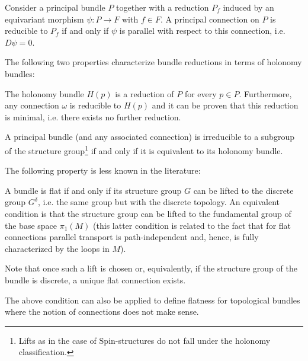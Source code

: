     \begin{property}\label{bundle:connection_reducibility}
        Consider a principal bundle $P$ together with a reduction $P_f$ induced by an equivariant morphism $\psi:P\rightarrow F$ with $f\in F$. A principal connection on $P$ is reducible to $P_f$ if and only if $\psi$ is parallel with respect to this connection, i.e. $D\psi = 0$.
    \end{property}

    The following two properties characterize bundle reductions in terms of holonomy bundles:
    \begin{property}
        The holonomy bundle $H(p)$ is a reduction of $P$ for every $p\in P$. Furthermore, any connection $\omega$ is reducible to $H(p)$ and it can be proven that this reduction is minimal, i.e. there exists no further reduction.
    \end{property}
    \begin{result}\label{bundle:reducible_holonomy}
        A principal bundle (and any associated connection) is irreducible to a subgroup of the structure group\footnote{Lifts as in the case of $\mathrm{Spin}$-structures do not fall under the holonomy classification.} if and only if it is equivalent to its holonomy bundle.
    \end{result}

    The following property is less known in the literature:
    \begin{property}\label{bundle:flat_connection_cohomology}
        A bundle is flat if and only if its structure group $G$ can be lifted to the discrete group $G^\delta$, i.e. the same group but with the discrete topology. An equivalent condition is that the structure group can be lifted to the fundamental group of the base space $\pi_1(M)$ (this latter condition is related to the fact that for flat connections parallel transport is path-independent and, hence, is fully characterized by the loops in $M$).

        Note that once such a lift is chosen or, equivalently, if the structure group of the bundle is discrete, a unique flat connection exists.
    \end{property}
    \begin{remark}
        The above condition can also be applied to define flatness for topological bundles where the notion of connections does not make sense.
    \end{remark}

